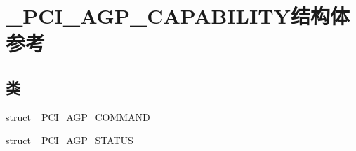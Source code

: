 \hypertarget{struct___p_c_i___a_g_p___c_a_p_a_b_i_l_i_t_y}{}\section{\+\_\+\+P\+C\+I\+\_\+\+A\+G\+P\+\_\+\+C\+A\+P\+A\+B\+I\+L\+I\+T\+Y结构体 参考}
\label{struct___p_c_i___a_g_p___c_a_p_a_b_i_l_i_t_y}
\subsection*{类}
\begin{DoxyCompactItemize}
\item 
struct \hyperlink{struct___p_c_i___a_g_p___c_a_p_a_b_i_l_i_t_y_1_1___p_c_i___a_g_p___c_o_m_m_a_n_d}{\+\_\+\+P\+C\+I\+\_\+\+A\+G\+P\+\_\+\+C\+O\+M\+M\+A\+ND}
\item 
struct \hyperlink{struct___p_c_i___a_g_p___c_a_p_a_b_i_l_i_t_y_1_1___p_c_i___a_g_p___s_t_a_t_u_s}{\+\_\+\+P\+C\+I\+\_\+\+A\+G\+P\+\_\+\+S\+T\+A\+T\+US}
\end{DoxyCompactItemize}
